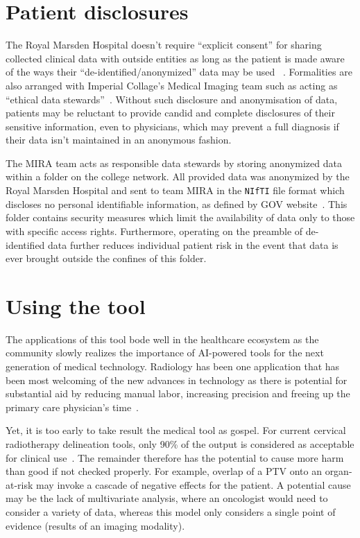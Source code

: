 \documentclass[11pt,twoside]{report}
\begin{document}
\section{Patient disclosures}\label{sect:patient-disclosures}

The Royal Marsden Hospital doesn't require ``explicit consent'' for sharing collected clinical data with outside entities as long as the patient is made aware of the ways their ``de-identified/anonymized'' data may be used ~\cite{royal-marsden-privacy-note}. Formalities are also arranged with Imperial Collage's Medical Imaging team such as acting as ``ethical data stewards''~\cite{ethics-imaging-AI}. Without such disclosure and anonymisation of data, patients may be reluctant to provide candid and complete disclosures of their sensitive information, even to physicians, which may prevent a full diagnosis if their data isn't maintained in an anonymous fashion.

The MIRA team acts as responsible data stewards by storing anonymized data within a folder on the college network. All provided data was anonymized by the Royal Marsden Hospital and sent to team MIRA in the \texttt{NIfTI} file format which discloses no personal identifiable information, as defined by GOV website~\cite{gov-gdpr}. This folder contains security measures which limit the availability of data only to those with specific access rights. Furthermore, operating on the preamble of de-identified data further reduces individual patient risk in the event that data is ever brought outside the confines of this folder.

\section{Using the tool}\label{sect:using-the-tool}

The applications of this tool bode well in the healthcare ecosystem as the community slowly realizes the importance of AI-powered tools for the next generation of medical technology. Radiology has been one application that has been most welcoming of the new advances in technology as there is potential for substantial aid by reducing manual labor, increasing precision and freeing up the primary care physician's time~\cite{overview-of-ai-medicine}.

Yet, it is too early to take result the medical tool as gospel. For current cervical radiotherapy delineation tools, only 90\% of the output is considered as acceptable for clinical use~\cite{auto-delineation-cervical-cancer-development}. The remainder therefore has the potential to cause more harm than good if not checked properly. For example, overlap of a PTV onto an organ-at-risk may invoke a cascade of negative effects for the patient. A potential cause may be the lack of multivariate analysis, where an oncologist would need to consider a variety of data, whereas this model only considers a single point of evidence (results of an imaging modality).
\end{document}
